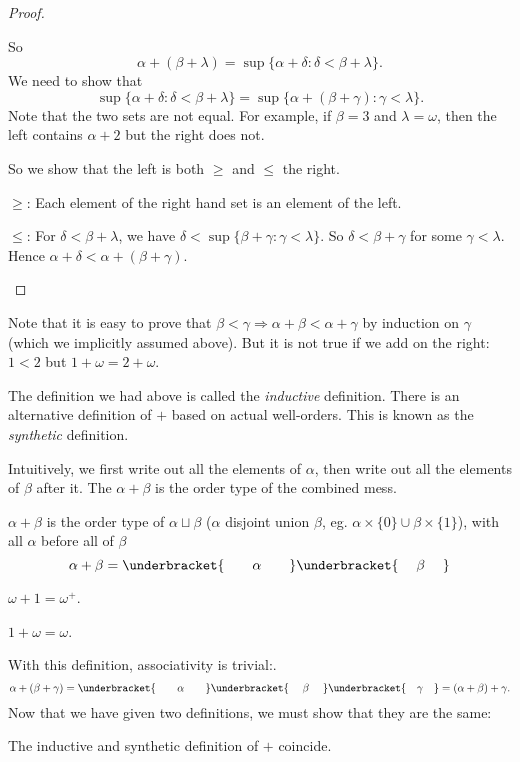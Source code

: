 \documentclass[a4paper]{article}
\begin{document}
\begin{proof}
\begin{enumerate}
    So
    \[
      \alpha + (\beta + \lambda) = \sup\{\alpha + \delta: \delta < \beta + \lambda\}.
    \]
    We need to show that
    \[
      \sup\{\alpha + \delta: \delta < \beta + \lambda\} = \sup\{\alpha + (\beta + \gamma): \gamma < \lambda\}.
    \]
    Note that the two sets are not equal. For example, if $\beta = 3$ and $\lambda = \omega$, then the left contains $\alpha + 2$ but the right does not.

    So we show that the left is both $\geq$ and $\leq$ the right.

    $\geq$: Each element of the right hand set is an element of the left.

    $\leq$: For $\delta < \beta + \lambda$, we have $\delta < \sup \{\beta + \gamma: \gamma < \lambda\}$. So $\delta < \beta + \gamma$ for some $\gamma < \lambda$. Hence $\alpha + \delta < \alpha + (\beta + \gamma)$.
\end{enumerate}
\end{proof}
Note that it is easy to prove that $\beta < \gamma \Rightarrow  \alpha + \beta < \alpha + \gamma$ by induction on $\gamma$ (which we implicitly assumed above). But it is not true if we add on the right: $1 < 2$ but $1 + \omega = 2 + \omega$.

The definition we had above is called the \emph{inductive} definition. There is an alternative definition of $+$ based on actual well-orders. This is known as the \emph{synthetic} definition.

Intuitively, we first write out all the elements of $\alpha$, then write out all the elements of $\beta$ after it. The $\alpha + \beta$ is the order type of the combined mess.

\begin{defi}
  $\alpha + \beta$ is the order type of $\alpha \sqcup \beta$ ($\alpha$ disjoint union $\beta$, eg. $\alpha\times \{0\}\cup \beta\times \{1\}$), with all $\alpha$ before all of $\beta$
  \[
    \alpha + \beta = \underbracket{\quad\quad\vphantom{\beta}\alpha\vphantom{\beta}\quad\quad}\underbracket{\quad\;\beta\;\quad}
  \]
\end{defi}
\begin{eg}
  $\omega + 1 = \omega^+$.

  $1 + \omega = \omega$.
\end{eg}

With this definition, associativity is trivial:.
\[
  \alpha + (\beta + \gamma) = \underbracket{\quad\quad\vphantom{\beta}\alpha\vphantom{\beta}\quad\quad}\underbracket{\quad\;\beta\;\quad}\underbracket{\quad\gamma\quad} = (\alpha + \beta) + \gamma.
\]
Now that we have given two definitions, we must show that they are the same:
\begin{prop}
  The inductive and synthetic definition of $+$ coincide.
\end{prop}
\end{document}
